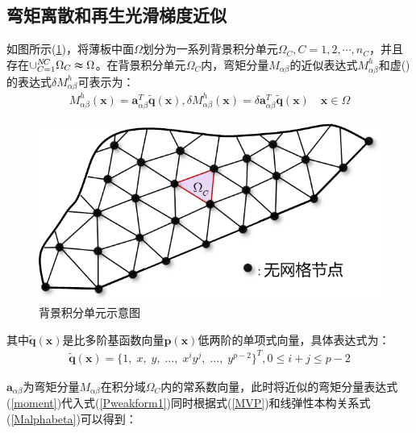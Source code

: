 \subsection{弯矩离散和再生光滑梯度近似}
如图所示(\ref{Pbackground})，将薄板中面$\Omega$划分为一系列背景积分单元$\Omega_C,C=1,2,\dotsb,n_C$，并且存在$\cup_{C=1}^{N\!C}\Omega_C\thickapprox\Omega$。在背景积分单元$\Omega_C$内，弯矩分量$M_{\alpha\beta}$的近似表达式$M^h_{\alpha\beta}$和虚()的表达式$\delta M^h_{\alpha\beta}$可表示为：
\begin{equation}\label{moment}
\begin{split}
    M^h_{\alpha\beta}(\pmb{x})=\pmb{a}_{\alpha\beta}^T\tilde{\pmb{q}}(\pmb{x}),\delta M^h_{\alpha\beta}(\pmb{x})=\delta\pmb{a}^T_{\alpha\beta}\tilde{\pmb{q}}(\pmb{x}) \quad \pmb{x}\in\Omega
\end{split}
\end{equation}
\begin{figure}[!h]
    \centering
    \includegraphics[scale=0.7]{figure/P/background.png}
    \caption{背景积分单元示意图}\label{Pbackground}
\end{figure}
其中$\tilde{\pmb{q}}(\pmb{x})$是比多阶基函数向量$\pmb{p}(\pmb{x})$低两阶的单项式向量，具体表达式为：
\begin{equation}
\begin{split}
    \tilde{\pmb{q}}(\pmb{x})=\{1,\;x,\;y,\;\dots,\;x^iy^j,\;\dots,\;y^{p-2}\}^T,0 \le i+j \le p-2
\end{split}
\end{equation}\par
$\pmb{a}_{\alpha\beta}$为弯矩分量$M_{\alpha\beta}$在积分域$\Omega_C$内的常系数向量，此时将近似的弯矩分量表达式(\ref{moment})代入式(\ref{Pweakform1})同时根据式(\ref{MVP})和线弹性本构关系式(\ref{Malphabeta})可以得到：
